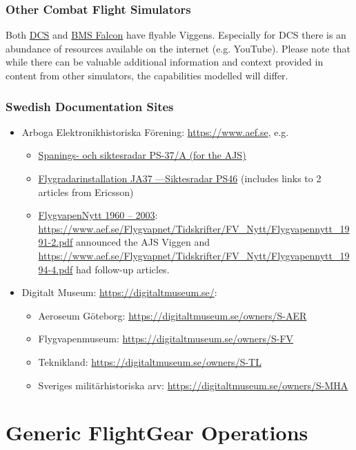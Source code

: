 \subsection{Other Combat Flight Simulators}
Both \href{https://www.digitalcombatsimulator.com/en/index.php}{DCS} and \href{https://www.benchmarksims.org/}{BMS Falcon} have flyable Viggens. Especially for DCS there is an abundance of resources available on the internet (e.g. YouTube). Please note that while there can be valuable additional information and context provided in content from other simulators, the capabilities modelled will differ.

\subsection{Swedish Documentation Sites}
\begin{itemize}
\item Arboga Elektronikhistoriska Förening: \url{https://www.aef.se}, e.g. 
\begin{itemize}
\item \href{https://www.aef.se/Avionik/Notiser/PS-37/PS-37A.htm}{Spanings- och siktesradar PS-37/A (for the AJS)}
\item \href{https://www.aef.se/Avionik/Notiser/Siktesradar_PS-46_1.htm}{Flygradarinstallation JA37 ---Siktesradar PS46} (includes links to 2 articles from Ericsson)
\item \href{https://www.aef.se/Flygvapnet/Tidskrifter/FV_Nytt/FVN_oversikt.htm}{FlygvapenNytt 1960 – 2003}: \url{https://www.aef.se/Flygvapnet/Tidskrifter/FV_Nytt/Flygvapennytt_1991-2.pdf} announced the AJS Viggen and \url{https://www.aef.se/Flygvapnet/Tidskrifter/FV_Nytt/Flygvapennytt_1994-4.pdf} had follow-up articles.
\end{itemize}
\item Digitalt Museum: \url{https://digitaltmuseum.se/}:
\begin{itemize}
\item Aeroseum Göteborg: \url{https://digitaltmuseum.se/owners/S-AER}
\item Flygvapenmuseum: \url{https://digitaltmuseum.se/owners/S-FV}
\item Teknikland: \url{https://digitaltmuseum.se/owners/S-TL}
\item Sveriges militärhistoriska arv: \url{https://digitaltmuseum.se/owners/S-MHA}
\end{itemize}
\end{itemize} 


\chapter{Generic FlightGear Operations}
